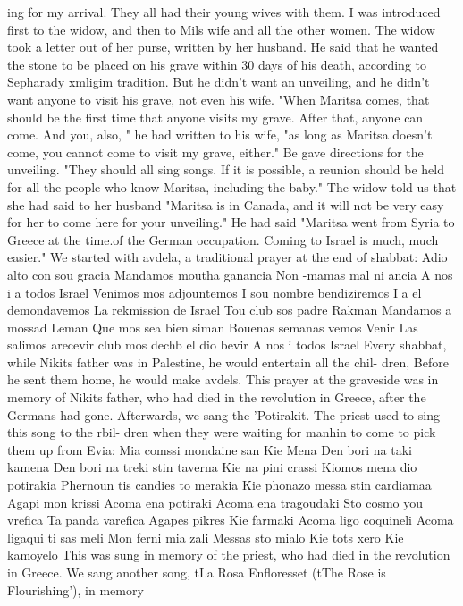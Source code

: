 ing for my arrival. They all had their young wives with them. I was introduced first 
to the widow, and then to Mils wife and all the other women. The widow took a letter 
out of her purse, written by her husband. He said that he wanted the stone to be placed 
on his grave within 30 days of his death, according to Sepharady xmligim tradition. But 
he didn't want an unveiling, and he didn't want anyone to visit his grave, not even his 
wife. "When Maritsa comes, that should be the first time that anyone visits my grave. 
After that, anyone can come. And you, also, " he had written to his wife, "as long as 
Maritsa doesn't come, you cannot come to visit my grave, either." Be gave directions 
for the unveiling. "They should all sing songs. If it is possible, a reunion should 
be held for all the people who know Maritsa, including the baby." 
The widow told us that she had said to her husband "Maritsa is in Canada, and it 
will not be very easy for her to come here for your unveiling." He had said "Maritsa 
went from Syria to Greece at the time.of the German occupation. Coming to Israel is 
much, much easier." 
We started with avdela, a traditional prayer at the end of shabbat: 
Adio alto con sou gracia 
Mandamos moutha ganancia 
Non -mamas mal ni ancia 
A nos i a todos Israel 
Venimos mos adjountemos 
I sou nombre bendiziremos 
I a el demondavemos 
La rekmission de Israel 
Tou club sos padre Rakman 
Mandamos a mossad Leman 
Que mos sea bien siman 
Bouenas semanas vemos 
Venir 
Las salimos arecevir 
club mos dechb el dio bevir 
A nos i todos Israel 
Every shabbat, while Nikits father was in Palestine, he would entertain all the chil-
dren, Before he sent them home, he would make avdels. This prayer at the graveside 
was in memory of Nikits father, who had died in the revolution in Greece, after the 
Germans had gone. 
Afterwards, we sang the 'Potirakit. The priest used to sing this song to the rbil-
dren when they were waiting for manhin to come to pick them up from Evia: 
Mia comssi mondaine san Kie Mena 
Den bori na taki kamena 
Den bori na treki stin taverna 
Kie na pini crassi 
Kiomos mena dio potirakia 
Phernoun tis candies to merakia 
Kie phonazo messa stin cardiamaa 
Agapi mon krissi 
Acoma ena potiraki 
Acoma ena tragoudaki 
Sto cosmo you vrefica 
Ta panda varefica 
Agapes pikres Kie farmaki 
Acoma ligo coquineli 
Acoma ligaqui ti sas meli 
Mon ferni mia zali 
Messas sto mialo 
Kie tots xero Kie kamoyelo 
This was sung in memory of the priest, who had died in the revolution in Greece. 
We sang another song, tLa Rosa Enfloresset (tThe Rose is Flourishing'), in memory 
